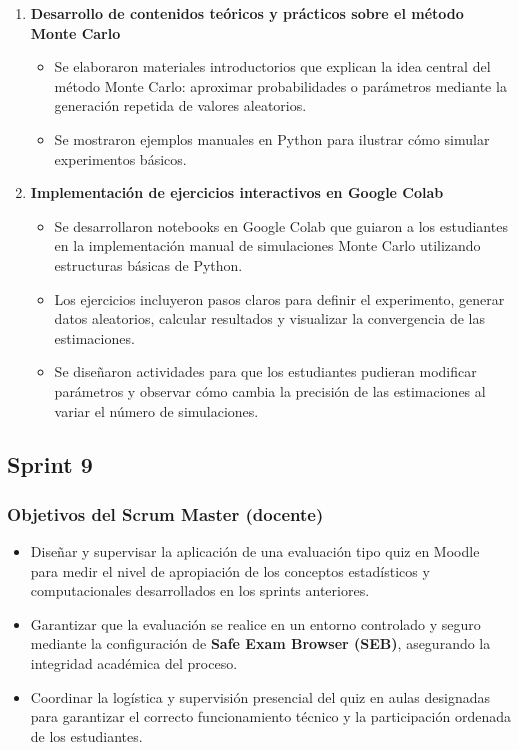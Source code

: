 \documentclass[letter,oneside,12pt,spanish]{report}
\begin{document}
\begin{enumerate}
	\item \textbf{Desarrollo de contenidos teóricos y prácticos sobre el método Monte Carlo}  
	\begin{itemize}
		\item Se elaboraron materiales introductorios que explican la idea central del método Monte Carlo: aproximar probabilidades o parámetros mediante la generación repetida de valores aleatorios.
		\item Se mostraron ejemplos manuales en Python para ilustrar cómo simular experimentos básicos.
	\end{itemize}
	
	\item \textbf{Implementación de ejercicios interactivos en Google Colab}  
	\begin{itemize}
		\item Se desarrollaron notebooks en Google Colab que guiaron a los estudiantes en la implementación manual de simulaciones Monte Carlo utilizando estructuras básicas de Python.
		\item Los ejercicios incluyeron pasos claros para definir el experimento, generar datos aleatorios, calcular resultados y visualizar la convergencia de las estimaciones.
		\item Se diseñaron actividades para que los estudiantes pudieran modificar parámetros y observar cómo cambia la precisión de las estimaciones al variar el número de simulaciones.
	\end{itemize}
\end{enumerate}


\subsection{Sprint 9}

\subsubsection*{Objetivos del Scrum Master (docente)}
\begin{itemize}
	\item Diseñar y supervisar la aplicación de una evaluación tipo quiz en Moodle para medir el nivel de apropiación de los conceptos estadísticos y computacionales desarrollados en los sprints anteriores.
	\item Garantizar que la evaluación se realice en un entorno controlado y seguro mediante la configuración de \textbf{Safe Exam Browser (SEB)}, asegurando la integridad académica del proceso.
	\item Coordinar la logística y supervisión presencial del quiz en aulas designadas para garantizar el correcto funcionamiento técnico y la participación ordenada de los estudiantes.
\end{itemize}
\end{document}
